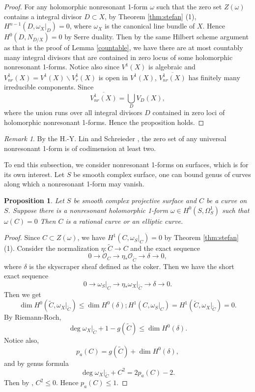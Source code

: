 \documentclass[a4paper,12pt,reqno]{amsart}
\theoremstyle{plain}
\newtheorem{proposition}[theorem]{Proposition}
\theoremstyle{remark}
\newtheorem{remark}[theorem]{Remark}
\begin{document}
 \begin{proof}
For any holomorphic nonresonant 1-form $\omega$ such that the zero set $Z(\omega)$ contains a integral divisor $D\subset X$, by Theorem \ref{thm:stefan} (1), $H^{n-1}(D, {\omega_X}|_D)=0$, where $\omega_X$ is the canonical line bundle of $X$. Hence $H^0(D, N_{D/X})=0$ by Serre duality. Then by the same Hilbert scheme argument as that is the proof of   Lemma \ref{countable}, we have there are at most countably many integral divisors that are contained in zero locus of some holomorphic nonresonant 1-forms.  Notice also since $V^1(X)$ is algebraic and $V^1_{nr}(X)=V^1(X)\backslash V_r^1(X)$ is open in $V^1(X)$, $\overline{V_{nr}^1(X)}$ has finitely many irreducible components. Since $$\overline{V_{nr}^1(X)}=\bigcup_{D}V_D(X),$$ where the union runs over all integral divisors $D$ contained in zero loci of holomorphic nonresonant 1-forms. Hence the proposition holds.
 \end{proof}
 
 \begin{remark}
By the H.-Y. Lin and Schreieder \cite[appendix]{SS19}, the zero set of any universal nonresonant 1-form is of codimension at least two. 
 \end{remark}

 To end this subsection, we consider nonresonant 1-forms on surfaces, which is for its own interest. Let $S$ be smooth complex surface, one can bound genus of curves along which a nonresonant 1-form may vanish.
 
 \begin{proposition}
 Let $S$ be smooth complex projective surface and $C$ be a curve on $S$. Suppose there is a nonresonant holomorphic 1-form $\omega\in H^0(S, \Omega_S^1)$ such that $\omega(C)=0$ Then $C$ is a rational curve or an elliptic curve.
 \end{proposition}
 
 
 \begin{proof}
 Since $C\subset Z(\omega)$, we have $H^1(C, {\omega_S}|_C)=0$ by Theorem \ref{thm:stefan} (1). Consider the normalization $\eta: \widetilde{C}\to C$ and the exact sequence $$0\to \mathcal{O}_C\to \eta_*\mathcal{O}_{\widetilde{C}}\to \delta\to 0, $$ where $\delta$ is the skyscraper sheaf defined as the coker. Then we have the short exact sequence $$0\to {\omega_S}|_C\to \eta_*{{\omega_X}|_{\widetilde{C}}}\to \delta\to 0.$$ Then we get $$\dim H^0(\widetilde{C}, {\omega_X}|_{\widetilde{C}})\leq \dim H^0(\delta);   H^1(C, {\omega_S}|_C)=H^1(\widetilde{C}, {\omega_X}|_{\widetilde{C}})=0.$$ By Riemann-Roch, $$\deg {\omega_X}|_{\widetilde{C}}+1-g(\widetilde{C})\leq \dim H^0(\delta).$$ Notice also, $$p_a(C)=g(\widetilde{C})+\dim H^0(\delta), $$ and by genus formula $$\deg {\omega_X}|_{\widetilde{C}}+C^2=2p_a(C)-2.$$ Then by \cite[Theorem 1]{Sp88}, $C^2\leq 0$. Hence $p_a(C)\leq1$.
 \end{proof}
 
\end{document}

